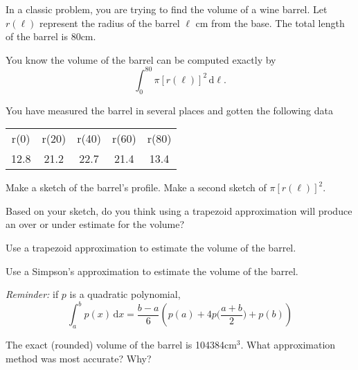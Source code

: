 \documentclass{workbook}
\begin{document}
\begin{slide}
	\question
	In a classic problem, you are trying to find the volume of a wine barrel. 
	Let $r(\ell)$ represent the radius of the barrel $\ell$ cm from the base. The total
	length of the barrel is 80cm.

	You know the volume of the barrel can be computed exactly by
	\[
		\int_0^{80}\pi [r(\ell)]^2\,\mathrm d \ell.
	\]

	You have measured the barrel in several places and gotten the following data
	\begin{center}
		\begin{tabular}{ccccc}
			r(0)&r(20)&r(40)&r(60)&r(80)\\
			12.8 & 21.2 & 22.7 & 21.4 & 13.4  \\
		\end{tabular}
	\end{center}

	\begin{parts}
		\item Make a sketch of the barrel's profile. Make a second sketch of $\pi [r(\ell)]^2$.

		\item Based on your sketch, do you think using a trapezoid approximation will produce an over 
		or under estimate for the volume?

		\item Use a trapezoid approximation to estimate the volume of the barrel.

		\item Use a Simpson's approximation to estimate the volume of the barrel. 
		
		\emph{Reminder:}
		if $p$ is a quadratic polynomial, 
		\[
		 \int_a^b p(x)\,\mathrm d x = \frac{b-a}{6}\left(p(a)+4p\Big(\frac{a+b}{2}\Big)+p(b)\right)
		 \]

		 \item The exact (rounded) volume of the barrel is 104384cm$^3$. What approximation
		 method was most accurate? Why?


	\end{parts}
\end{slide}
\end{document}
